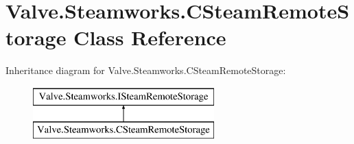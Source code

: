\hypertarget{classValve_1_1Steamworks_1_1CSteamRemoteStorage}{}\section{Valve.\+Steamworks.\+C\+Steam\+Remote\+Storage Class Reference}
\label{classValve_1_1Steamworks_1_1CSteamRemoteStorage}
Inheritance diagram for Valve.\+Steamworks.\+C\+Steam\+Remote\+Storage\+:\begin{figure}[H]
\begin{center}
\leavevmode
\includegraphics[height=2.000000cm]{classValve_1_1Steamworks_1_1CSteamRemoteStorage}
\end{center}
\end{figure}
